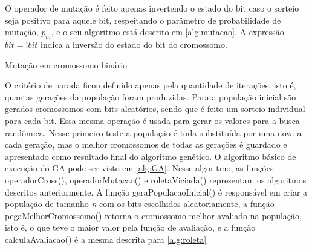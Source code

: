 O operador de mutação é feito apenas invertendo o estado do bit caso o sorteio seja positivo para aquele bit, respeitando o parâmetro de probabilidade de mutação, \(p_m\), e o seu algoritmo está descrito em \autoref{alg:mutacao}. A expressão \(bit = !bit\) indica a inversão do estado do bit do cromossomo.

\begin{algorithm}[h!]
	\LinesNumbered
	\caption{Mutação em cromossomo binário}
	\label{alg:mutacao}
\end{algorithm}

O critério de parada ficou definido apenas pela quantidade de iterações, isto é, quantas gerações da população foram produzidas. Para a população inicial são gerados cromossomos com bits aleatórios, sendo que é feito um sorteio individual para cada bit. Essa mesma operação é usada para gerar os valores para a busca randômica. Nesse primeiro teste a população é toda substituída por uma nova a cada geração, mas o melhor cromossomos de todas as gerações é guardado e apresentado como resultado final do algoritmo genético. O algoritmo básico de execução do GA pode ser visto em \autoref{alg:GA}. Nesse algoritmo, as funções \textsf{operadorCross()}, \textsf{operadorMutacao()} e \textsf{roletaViciada()} representam os algoritmos descritos anteriormente. A função \textsf{geraPopulacaoInicial()} é responsável em criar a população de tamanho \textit{n} com os bits escolhidos aleatoriamente, a função \mbox{\textsf{pegaMelhorCromossomo()}} retorna o cromossomo melhor avaliado na população, isto é, o que teve o maior valor pela função de avaliação, e a função \textsf{calculaAvaliacao()} é a mesma descrita para \autoref{alg:roleta}

